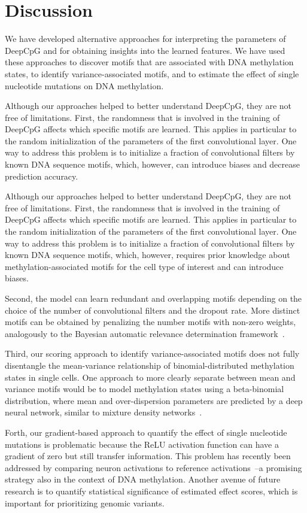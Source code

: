 \section{Discussion}

We have developed alternative approaches for interpreting the parameters of DeepCpG and for obtaining insights into the learned features. We have used these approaches to discover motifs that are associated with DNA methylation states, to identify variance-associated motifs, and to estimate the effect of single nucleotide mutations on DNA methylation.

Although our approaches helped to better understand DeepCpG, they are not free of limitations. First, the randomness that is involved in the training of DeepCpG affects which specific motifs are learned. This applies in particular to the random initialization of the parameters of the first convolutional layer. One way to address this problem is to initialize a fraction of convolutional filters by known DNA sequence motifs, which, however, can introduce biases and decrease prediction accuracy.

Although our approaches helped to better understand DeepCpG, they are not free of limitations. First, the randomness that is involved in the training of DeepCpG affects which specific motifs are learned. This applies in particular to the random initialization of the parameters of the first convolutional layer. One way to address this problem is to initialize a fraction of convolutional filters by known DNA sequence motifs, which, however, requires prior knowledge about methylation-associated motifs for the cell type of interest and can introduce biases.

Second, the model can learn redundant and overlapping motifs depending on the choice of the number of convolutional filters and the dropout rate. More distinct motifs can be obtained by penalizing the number motifs with non-zero weights, analogously to the Bayesian automatic relevance determination framework~\citep{mackay_bayesian_1992,neal_bayesian_2012}.

Third, our scoring approach to identify variance-associated motifs does not fully disentangle the mean-variance relationship of binomial-distributed methylation states in single cells. One approach to more clearly separate between mean and variance motifs would be to model methylation states using a beta-binomial distribution, where mean and over-dispersion parameters are predicted by a deep neural network, similar to mixture density networks~\citep{bishop1994mixture}.

Forth, our gradient-based approach to quantify the effect of single nucleotide mutations is problematic because the ReLU activation function can have a gradient of zero but still transfer information. This problem has recently been addressed by comparing neuron activations to reference activations~\citep{shrikumar_not_2016}--a promising strategy also in the context of DNA methylation. Another avenue of future research is to quantify statistical significance of estimated effect scores, which is important for prioritizing genomic variants.
